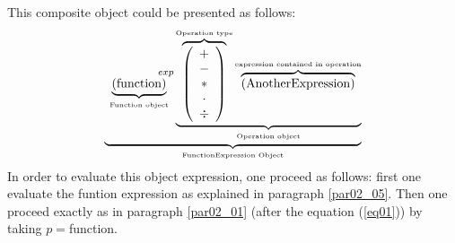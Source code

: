 \documentclass[a4paper,11pt] {article}
\begin{document}
This composite object could be presented as follows:
\begin{equation}
 \underbrace{    \underbrace{ \left(\mbox{function}\right) }_{\mbox{\tiny Function object}} ^{\hspace{15mm}exp} \underbrace{  \overbrace{\left( \begin{array}{c} + \\ - \\ \ast  \\ \cdot \\ \div   \end{array} \right) }^{\mbox{\tiny Operation type}}
 \overbrace{    \left( \mbox{AnotherExpression}\right) }^{\mbox{\tiny expression contained in operation}}   }_{\mbox{\tiny Operation object}}}_{\mbox{\tiny FunctionExpression Object}}
\end{equation}
In order to evaluate this object expression, one proceed as follows: first one evaluate the funtion expression as explained in paragraph  \ref{par02_05}. Then one proceed exactly as in paragraph \ref{par02_01} (after the equation (\ref{eq01})) by taking $p=$function.
\end{document}
